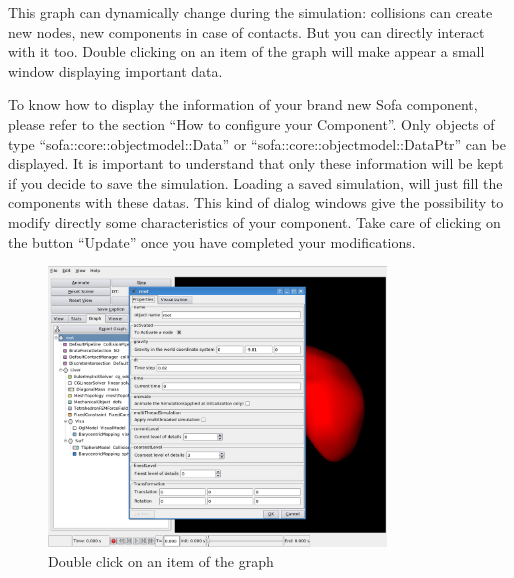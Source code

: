 This graph can dynamically change during the simulation: collisions can create new nodes, new components in case of contacts. But you can directly interact with it too. Double clicking on an item of the graph will make appear a small window displaying important data.

To know how to display the information of your brand new Sofa component, please refer to the section ``How to configure your Component''. Only objects of type ``sofa::core::objectmodel::Data'' or ``sofa::core::objectmodel::DataPtr'' can be displayed. It is important to understand that only these information will be kept if you decide to save the simulation. Loading a saved simulation, will just fill the components with these datas.
This kind of dialog windows give the possibility to modify directly some characteristics of your component. Take care of clicking on the button ``Update'' once you have completed your modifications.

\begin{figure}[htpb]
	\centering
		\includegraphics[width=0.8\textwidth]{GUI/GUI_modify.png}
	\caption{Double click on an item of the graph}
\end{figure}

